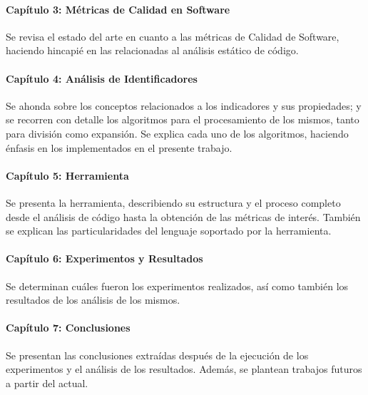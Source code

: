 \paragraph[]{Capítulo 3: Métricas de Calidad en Software} Se revisa el estado del arte
en cuanto a las métricas de Calidad de Software, haciendo hincapié en las relacionadas al análisis
estático de código.

\paragraph[]{Capítulo 4: Análisis de Identificadores} Se ahonda sobre los conceptos relacionados
a los indicadores y sus propiedades; y se recorren con detalle los algoritmos para el procesamiento
de los mismos, tanto para división como expansión.
Se explica cada uno de los algoritmos, haciendo énfasis en los implementados en el presente trabajo.

\paragraph[]{Capítulo 5: Herramienta} Se presenta la herramienta, describiendo su estructura y
el proceso completo desde el análisis de código hasta la obtención de las métricas de interés.
También se explican las particularidades del lenguaje soportado por la herramienta.

\paragraph[]{Capítulo 6: Experimentos y Resultados} Se determinan cuáles fueron los experimentos
realizados, así como también los resultados de los análisis de los mismos.

\paragraph[]{Capítulo 7: Conclusiones} Se presentan las conclusiones extraídas 
después de la ejecución de los experimentos y el análisis de los resultados.
Además, se plantean trabajos futuros a partir del actual.
